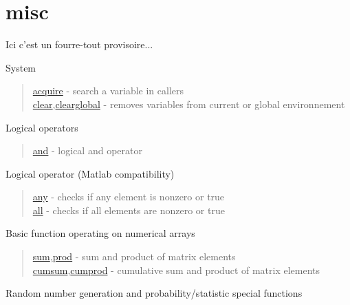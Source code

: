 \chapter*{misc}

Ici c'est un fourre-tout provisoire... 

System

\begin{quote}
\noindent
\hyperlink{acquire}{acquire} - search a variable in callers  \\
\hyperlink{clear}{clear},\hyperlink{clearglobal}{clearglobal} - removes variables from current or global environnement  \\
\end{quote}


Logical operators
\begin{quote}
\noindent
\hyperlink{and}{and} - logical and operator \\
\end{quote}

Logical operator (Matlab compatibility)

\begin{quote}
\noindent
\hyperlink{any}{any} - checks if any element is nonzero or true  \\
\hyperlink{all}{all} - checks if all elements are nonzero or true \\
\end{quote}

Basic function operating on numerical arrays
\begin{quote}
\noindent
\hyperlink{sum}{sum},\hyperlink{prod}{prod} - sum and product of matrix elements \\
\hyperlink{cumsum}{cumsum},\hyperlink{cumprod}{cumprod} - cumulative sum and product of matrix elements \\
\end{quote}
 

Random number generation and probability/statistic special functions

